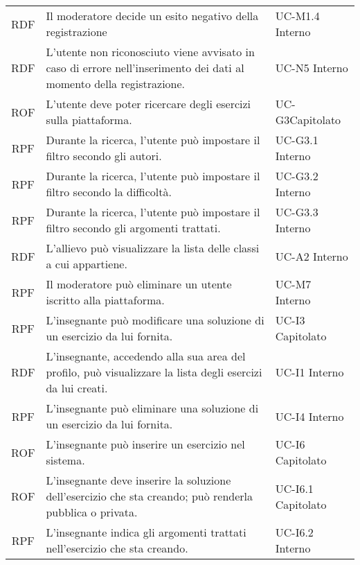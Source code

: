 \begin{tabularx}{\textwidth}{| c | p{10cm} | X |}
		RDF & Il moderatore decide un esito negativo della registrazione & UC-M1.4 \newline Interno\\
		RDF & L'utente non riconosciuto viene avvisato in caso di errore nell'inserimento dei dati al momento della registrazione. & UC-N5 \newline Interno\\
		ROF & L'utente deve poter ricercare degli esercizi sulla piattaforma. & UC-G3\newline Capitolato\\
		RPF & Durante la ricerca, l'utente può impostare il filtro secondo gli autori. & UC-G3.1 \newline Interno\\
		RPF & Durante la ricerca, l'utente può impostare il filtro secondo la difficoltà. & UC-G3.2 \newline Interno\\
		RPF & Durante la ricerca, l'utente può impostare il filtro secondo gli argomenti trattati. & UC-G3.3 \newline Interno\\
		RDF & L'allievo può visualizzare la lista delle classi a cui appartiene. & UC-A2 \newline Interno\\
		RPF & Il moderatore può eliminare un utente iscritto alla piattaforma. & UC-M7 \newline Interno\\
		RPF & L'insegnante può modificare una soluzione di un esercizio da lui fornita. & UC-I3 \newline Capitolato\\
		RDF & L'insegnante, accedendo alla sua area del profilo, può visualizzare la lista degli esercizi da lui creati. & UC-I1 \newline Interno\\
		RPF & L'insegnante può eliminare una soluzione di un esercizio da lui fornita. & UC-I4 \newline Interno\\
		ROF & L'insegnante può inserire un esercizio nel sistema. & UC-I6 \newline Capitolato\\
		ROF & L'insegnante deve inserire la soluzione dell'esercizio che sta creando; può renderla pubblica o privata. & UC-I6.1 \newline Capitolato\\
		RPF & L'insegnante indica gli argomenti trattati nell'esercizio che sta creando. & UC-I6.2 \newline Interno\\

\end{tabularx}
